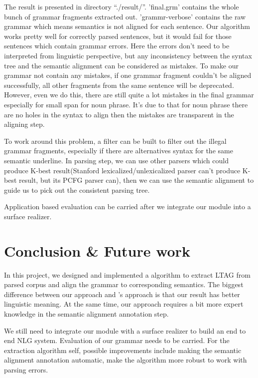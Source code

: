 \documentclass[a4paper]{article}
\begin{document}
The result is presented in directory ``./result/''. 'final.grm' contains the whole bunch of grammar fragments extracted out. 'grammr-verbose' contains the raw grammar which means semantics is not aligned for each sentence. Our algorithm works pretty well for correctly parsed sentences, but it would fail for those sentences which contain grammar errors. Here the errors don't need to be interpreted from linguistic perspective, but any inconsistency between the syntax tree and the semantic alignment can be considered as mistakes. To make our grammar not contain any mistakes, if one grammar fragment couldn't be aligned successfully, all other fragments from the same sentence will be deprecated.
However, even we do this, there are still quite a lot mistakes in the final grammar especially for small span for noun phrase. It's due to that for noun phrase there are no holes in the syntax to align then the mistakes are transparent in the aligning step.

To work around this problem, a filter can be built to filter out the illegal grammar fragments, especially if there are alternatives syntax for the same semantic underline. In parsing step, we can use other parsers which could produce K-best result(Stanford lexicalized/unlexicalized parser can't produce K-best result, but its PCFG parser can), then we can use the semantic alignment to guide us to pick out the consistent parsing tree.

Application based evaluation can be carried after we integrate our module into a surface realizer.

\section{Conclusion \& Future work}
In this project, we designed and implemented a algorithm to extract LTAG from parsed corpus and align the grammar to corresponding semantics. The biggest difference between our approach and \citet{DeVault2008a}'s approach is that our result has better linguistic meaning. At the same time, our approach requires a bit more expert knowledge in the semantic alignment annotation step. 

We still need to integrate our module with a surface realizer to build an end to end NLG system. Evaluation of our grammar needs to be carried.
For the extraction algorithm self, possible improvements include making the semantic alignment annotation automatic, make the algorithm more robust to work with parsing errors.
\printbibliography
\end{document}
